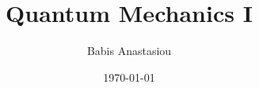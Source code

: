 \documentclass[9pt,oneside]{memoir}
\title{\Huge Quantum Mechanics I}
\author{\LARGE Babis Anastasiou}
\date{\vspace{1em}\today}
\begin{document}
 

\begin{titlingpage}
\end{titlingpage}







\begin{multicols*}{3}
	
\end{multicols*}
\end{document}
